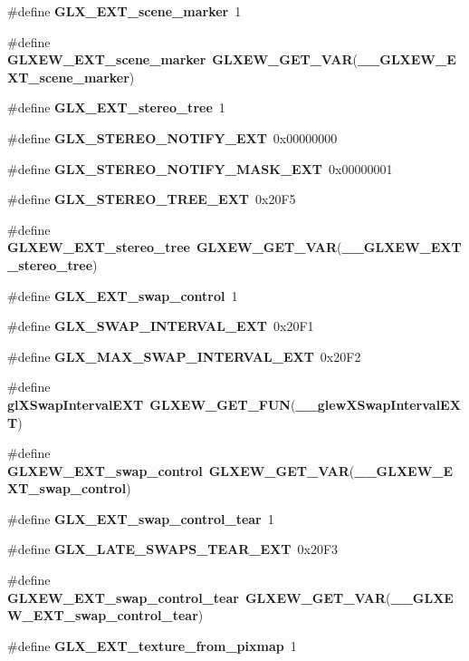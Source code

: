 \begin{DoxyCompactItemize}
\item 
\#define {\bf G\+L\+X\+\_\+\+E\+X\+T\+\_\+scene\+\_\+marker}~1
\item 
\#define {\bf G\+L\+X\+E\+W\+\_\+\+E\+X\+T\+\_\+scene\+\_\+marker}~{\bf G\+L\+X\+E\+W\+\_\+\+G\+E\+T\+\_\+\+V\+AR}({\bf \+\_\+\+\_\+\+G\+L\+X\+E\+W\+\_\+\+E\+X\+T\+\_\+scene\+\_\+marker})
\item 
\#define {\bf G\+L\+X\+\_\+\+E\+X\+T\+\_\+stereo\+\_\+tree}~1
\item 
\#define {\bf G\+L\+X\+\_\+\+S\+T\+E\+R\+E\+O\+\_\+\+N\+O\+T\+I\+F\+Y\+\_\+\+E\+XT}~0x00000000
\item 
\#define {\bf G\+L\+X\+\_\+\+S\+T\+E\+R\+E\+O\+\_\+\+N\+O\+T\+I\+F\+Y\+\_\+\+M\+A\+S\+K\+\_\+\+E\+XT}~0x00000001
\item 
\#define {\bf G\+L\+X\+\_\+\+S\+T\+E\+R\+E\+O\+\_\+\+T\+R\+E\+E\+\_\+\+E\+XT}~0x20\+F5
\item 
\#define {\bf G\+L\+X\+E\+W\+\_\+\+E\+X\+T\+\_\+stereo\+\_\+tree}~{\bf G\+L\+X\+E\+W\+\_\+\+G\+E\+T\+\_\+\+V\+AR}({\bf \+\_\+\+\_\+\+G\+L\+X\+E\+W\+\_\+\+E\+X\+T\+\_\+stereo\+\_\+tree})
\item 
\#define {\bf G\+L\+X\+\_\+\+E\+X\+T\+\_\+swap\+\_\+control}~1
\item 
\#define {\bf G\+L\+X\+\_\+\+S\+W\+A\+P\+\_\+\+I\+N\+T\+E\+R\+V\+A\+L\+\_\+\+E\+XT}~0x20\+F1
\item 
\#define {\bf G\+L\+X\+\_\+\+M\+A\+X\+\_\+\+S\+W\+A\+P\+\_\+\+I\+N\+T\+E\+R\+V\+A\+L\+\_\+\+E\+XT}~0x20\+F2
\item 
\#define {\bf gl\+X\+Swap\+Interval\+E\+XT}~{\bf G\+L\+X\+E\+W\+\_\+\+G\+E\+T\+\_\+\+F\+UN}({\bf \+\_\+\+\_\+glew\+X\+Swap\+Interval\+E\+XT})
\item 
\#define {\bf G\+L\+X\+E\+W\+\_\+\+E\+X\+T\+\_\+swap\+\_\+control}~{\bf G\+L\+X\+E\+W\+\_\+\+G\+E\+T\+\_\+\+V\+AR}({\bf \+\_\+\+\_\+\+G\+L\+X\+E\+W\+\_\+\+E\+X\+T\+\_\+swap\+\_\+control})
\item 
\#define {\bf G\+L\+X\+\_\+\+E\+X\+T\+\_\+swap\+\_\+control\+\_\+tear}~1
\item 
\#define {\bf G\+L\+X\+\_\+\+L\+A\+T\+E\+\_\+\+S\+W\+A\+P\+S\+\_\+\+T\+E\+A\+R\+\_\+\+E\+XT}~0x20\+F3
\item 
\#define {\bf G\+L\+X\+E\+W\+\_\+\+E\+X\+T\+\_\+swap\+\_\+control\+\_\+tear}~{\bf G\+L\+X\+E\+W\+\_\+\+G\+E\+T\+\_\+\+V\+AR}({\bf \+\_\+\+\_\+\+G\+L\+X\+E\+W\+\_\+\+E\+X\+T\+\_\+swap\+\_\+control\+\_\+tear})
\item 
\#define {\bf G\+L\+X\+\_\+\+E\+X\+T\+\_\+texture\+\_\+from\+\_\+pixmap}~1
\item 

\end{DoxyCompactItemize}
